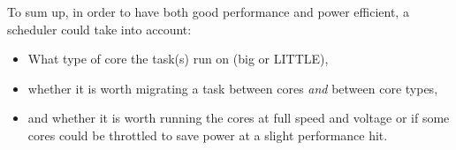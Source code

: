 To sum up, in order to have both good performance and power efficient, a
scheduler could take into account:
\begin{itemize}
    \item What type of core the task(s) run on (big or LITTLE),
    \item whether it is worth migrating a task between cores \textit{and}
          between core types,
    \item and whether it is worth running the cores at full speed and voltage
          or if some cores could be throttled to save power at a slight
          performance hit.
\end{itemize}
